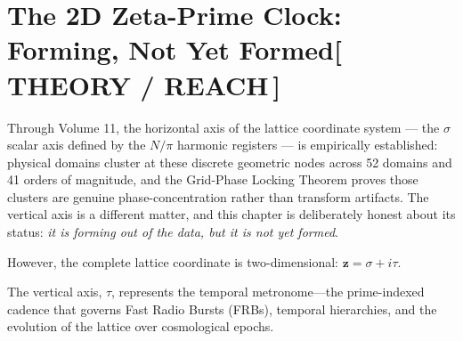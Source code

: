 \documentclass[12pt,oneside]{book}
\newcommand{\TheoryTag}{\;\colorbox{theorytag!15}{\textcolor{theorytag}{\footnotesize\bfseries [\,THEORY / REACH\,]}}}
\begin{document}
\chapter{The 2D Zeta-Prime Clock: Forming, Not Yet Formed\TheoryTag}

Through Volume 11, the horizontal axis of the lattice coordinate system --- the $\sigma$ scalar axis defined by the $N/\pi$ harmonic registers --- is empirically established: physical domains cluster at these discrete geometric nodes across 52 domains and 41 orders of magnitude, and the Grid-Phase Locking Theorem proves those clusters are genuine phase-concentration rather than transform artifacts. The vertical axis is a different matter, and this chapter is deliberately honest about its status: \emph{it is forming out of the data, but it is not yet formed}.

However, the complete lattice coordinate is two-dimensional: $\mathbf{z} = \sigma + i\tau$. 

The vertical axis, $\tau$, represents the temporal metronome—the prime-indexed cadence that governs Fast Radio Bursts (FRBs), temporal hierarchies, and the evolution of the lattice over cosmological epochs. 
\end{document}
